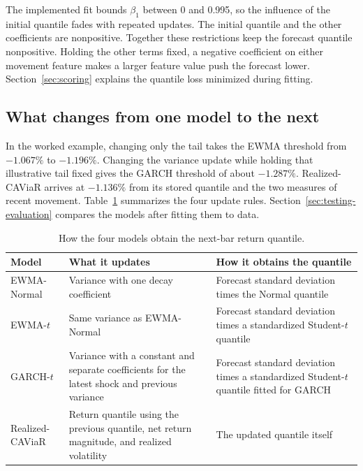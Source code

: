\documentclass[
	12pt,				%
	openright,			%
	twoside,			%
	a4paper,
	chapter=TITLE,
	english				%
	]{abntex2}
\begin{document}
The implemented fit bounds $\beta_1$ between 0 and 0.995, so the influence of the initial quantile fades with repeated updates. The initial quantile and the other coefficients are nonpositive. Together these restrictions keep the forecast quantile nonpositive. Holding the other terms fixed, a negative coefficient on either movement feature makes a larger feature value push the forecast lower. Section~\ref{sec:scoring} explains the quantile loss minimized during fitting.

\subsection{What changes from one model to the next}

In the worked example, changing only the tail takes the EWMA threshold from $-1.067\%$ to $-1.196\%$. Changing the variance update while holding that illustrative tail fixed gives the GARCH threshold of about $-1.287\%$. Realized-CAViaR arrives at $-1.136\%$ from its stored quantile and the two measures of recent movement. Table~\ref{tab:model-summary} summarizes the four update rules. Section~\ref{sec:testing-evaluation} compares the models after fitting them to data.

\begin{table}[htbp]
\centering
\caption{How the four models obtain the next-bar return quantile.}
\label{tab:model-summary}
\begin{tabular}{@{}l>{\raggedright\arraybackslash}p{}
                   >{\raggedright\arraybackslash}p{}@{}}
\toprule
Model & What it updates & How it obtains the quantile \\
\midrule
EWMA-Normal & Variance with one decay coefficient & Forecast standard deviation times the Normal quantile \\
EWMA-$t$ & Same variance as EWMA-Normal & Forecast standard deviation times a standardized Student-$t$ quantile \\
GARCH-$t$ & Variance with a constant and separate coefficients for the latest shock and previous variance & Forecast standard deviation times a standardized Student-$t$ quantile fitted for GARCH \\
Realized-CAViaR & Return quantile using the previous quantile, net return magnitude, and realized volatility & The updated quantile itself \\
\bottomrule
\end{tabular}
\end{table}
\end{document}

